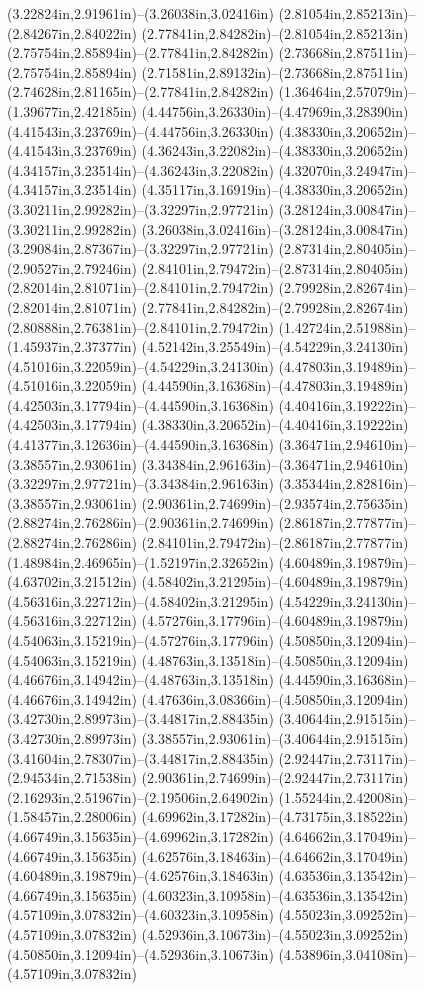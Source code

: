 (3.22824in,2.91961in)--(3.26038in,3.02416in) (2.81054in,2.85213in)--(2.84267in,2.84022in) (2.77841in,2.84282in)--(2.81054in,2.85213in) (2.75754in,2.85894in)--(2.77841in,2.84282in) (2.73668in,2.87511in)--(2.75754in,2.85894in) (2.71581in,2.89132in)--(2.73668in,2.87511in) (2.74628in,2.81165in)--(2.77841in,2.84282in) (1.36464in,2.57079in)--(1.39677in,2.42185in) (4.44756in,3.26330in)--(4.47969in,3.28390in) (4.41543in,3.23769in)--(4.44756in,3.26330in) (4.38330in,3.20652in)--(4.41543in,3.23769in) (4.36243in,3.22082in)--(4.38330in,3.20652in) (4.34157in,3.23514in)--(4.36243in,3.22082in) (4.32070in,3.24947in)--(4.34157in,3.23514in) (4.35117in,3.16919in)--(4.38330in,3.20652in) (3.30211in,2.99282in)--(3.32297in,2.97721in) (3.28124in,3.00847in)--(3.30211in,2.99282in) (3.26038in,3.02416in)--(3.28124in,3.00847in) (3.29084in,2.87367in)--(3.32297in,2.97721in) (2.87314in,2.80405in)--(2.90527in,2.79246in) (2.84101in,2.79472in)--(2.87314in,2.80405in) (2.82014in,2.81071in)--(2.84101in,2.79472in) (2.79928in,2.82674in)--(2.82014in,2.81071in) (2.77841in,2.84282in)--(2.79928in,2.82674in) (2.80888in,2.76381in)--(2.84101in,2.79472in) (1.42724in,2.51988in)--(1.45937in,2.37377in) (4.52142in,3.25549in)--(4.54229in,3.24130in) (4.51016in,3.22059in)--(4.54229in,3.24130in) (4.47803in,3.19489in)--(4.51016in,3.22059in) (4.44590in,3.16368in)--(4.47803in,3.19489in) (4.42503in,3.17794in)--(4.44590in,3.16368in) (4.40416in,3.19222in)--(4.42503in,3.17794in) (4.38330in,3.20652in)--(4.40416in,3.19222in) (4.41377in,3.12636in)--(4.44590in,3.16368in) (3.36471in,2.94610in)--(3.38557in,2.93061in) (3.34384in,2.96163in)--(3.36471in,2.94610in) (3.32297in,2.97721in)--(3.34384in,2.96163in) (3.35344in,2.82816in)--(3.38557in,2.93061in) (2.90361in,2.74699in)--(2.93574in,2.75635in) (2.88274in,2.76286in)--(2.90361in,2.74699in) (2.86187in,2.77877in)--(2.88274in,2.76286in) (2.84101in,2.79472in)--(2.86187in,2.77877in) (1.48984in,2.46965in)--(1.52197in,2.32652in) (4.60489in,3.19879in)--(4.63702in,3.21512in) (4.58402in,3.21295in)--(4.60489in,3.19879in) (4.56316in,3.22712in)--(4.58402in,3.21295in) (4.54229in,3.24130in)--(4.56316in,3.22712in) (4.57276in,3.17796in)--(4.60489in,3.19879in) (4.54063in,3.15219in)--(4.57276in,3.17796in) (4.50850in,3.12094in)--(4.54063in,3.15219in) (4.48763in,3.13518in)--(4.50850in,3.12094in) (4.46676in,3.14942in)--(4.48763in,3.13518in) (4.44590in,3.16368in)--(4.46676in,3.14942in) (4.47636in,3.08366in)--(4.50850in,3.12094in) (3.42730in,2.89973in)--(3.44817in,2.88435in) (3.40644in,2.91515in)--(3.42730in,2.89973in) (3.38557in,2.93061in)--(3.40644in,2.91515in) (3.41604in,2.78307in)--(3.44817in,2.88435in) (2.92447in,2.73117in)--(2.94534in,2.71538in) (2.90361in,2.74699in)--(2.92447in,2.73117in) (2.16293in,2.51967in)--(2.19506in,2.64902in) (1.55244in,2.42008in)--(1.58457in,2.28006in) (4.69962in,3.17282in)--(4.73175in,3.18522in) (4.66749in,3.15635in)--(4.69962in,3.17282in) (4.64662in,3.17049in)--(4.66749in,3.15635in) (4.62576in,3.18463in)--(4.64662in,3.17049in) (4.60489in,3.19879in)--(4.62576in,3.18463in) (4.63536in,3.13542in)--(4.66749in,3.15635in) (4.60323in,3.10958in)--(4.63536in,3.13542in) (4.57109in,3.07832in)--(4.60323in,3.10958in) (4.55023in,3.09252in)--(4.57109in,3.07832in) (4.52936in,3.10673in)--(4.55023in,3.09252in) (4.50850in,3.12094in)--(4.52936in,3.10673in) (4.53896in,3.04108in)--(4.57109in,3.07832in) 